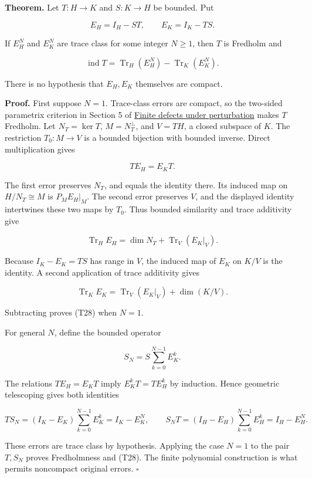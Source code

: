 \documentclass[
  11pt,
]{article}
\begin{document}
\textbf{Theorem.} Let \(T:H\to K\) and \(S:K\to H\) be bounded. Put

\[
E_H=I_H-ST,\qquad E_K=I_K-TS.
\]

If \(E_H^N\) and \(E_K^N\) are trace class for some integer \(N\geq1\),
then \(T\) is Fredholm and

\[
\operatorname{ind}T
=\operatorname{Tr}_H(E_H^N)-\operatorname{Tr}_K(E_K^N).      \tag{T28}
\]

There is no hypothesis that \(E_H,E_K\) themselves are compact.

\textbf{Proof.} First suppose \(N=1\). Trace-class errors are compact,
so the two-sided parametrix criterion in Section 5 of
\href{fredholm-stability.pdf}{Finite defects under perturbation} makes
\(T\) Fredholm. Let \(N_T=\ker T\), \(M=N_T^\perp\), and \(V=TH\), a
closed subspace of \(K\). The restriction \(T_0:M\to V\) is a bounded
bijection with bounded inverse. Direct multiplication gives

\[
TE_H=E_KT.
\]

The first error preserves \(N_T\), and equals the identity there. Its
induced map on \(H/N_T\cong M\) is \(P_ME_H|_M\). The second error
preserves \(V\), and the displayed identity intertwines these two maps
by \(T_0\). Thus bounded similarity and trace additivity give

\[
\operatorname{Tr}_H E_H
=\dim N_T+\operatorname{Tr}_V(E_K|_V).
\]

Because \(I_K-E_K=TS\) has range in \(V\), the induced map of \(E_K\) on
\(K/V\) is the identity. A second application of trace additivity gives

\[
\operatorname{Tr}_K E_K
=\operatorname{Tr}_V(E_K|_V)+\dim(K/V).
\]

Subtracting proves (T28) when \(N=1\).

For general \(N\), define the bounded operator

\[
S_N=S\sum_{k=0}^{N-1}E_K^k.                                 \tag{T29}
\]

The relations \(TE_H=E_KT\) imply \(E_K^kT=TE_H^k\) by induction. Hence
geometric telescoping gives both identities

\[
TS_N=(I_K-E_K)\sum_{k=0}^{N-1}E_K^k=I_K-E_K^N,\qquad
S_NT=(I_H-E_H)\sum_{k=0}^{N-1}E_H^k=I_H-E_H^N.              \tag{T30}
\]

These errors are trace class by hypothesis. Applying the case \(N=1\) to
the pair \(T,S_N\) proves Fredholmness and (T28). The finite polynomial
construction is what permits noncompact original errors. \(\square\)
\end{document}
